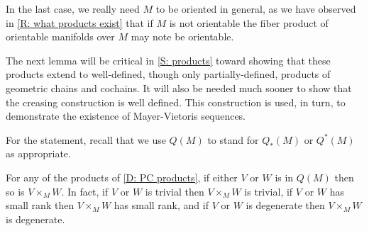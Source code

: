 In the last case, we really need $M$ to be oriented in general, as we have observed in \cref{R: what products exist} that if $M$ is not orientable the fiber product of orientable manifolds over $M$ may note be orientable.

\begin{comment}
In the cases where $r_V$ and $r_W$ are transverse embeddings, these products are represented by just taking intersections, with the orientations or co-orientations given explicitly in \cref{P: normal pullback,P: cap of immersions,P: orient intersection}.
If $r_V$ and $r_W$ are immersions, these descriptions hold locally.
\end{comment}

The next lemma will be critical in \cref{S: products} toward showing that these products extend to well-defined, though only partially-defined, products of geometric chains and cochains.
It will also be needed much sooner to show that the creasing construction is well defined.
This construction is used, in turn, to demonstrate the existence of Mayer-Vietoris sequences.

For the statement, recall that we use $Q(M)$ to stand for $Q_*(M)$ or $Q^*(M)$ as appropriate. 

\begin{lemma}\label{L: pullback with Q}
	For any of the products of \cref{D: PC products}, if either $V$ or $W$ is in $Q(M)$ then so is $V \times_M W$.
	In fact, if $V$ or $W$ is trivial then $V \times_M W$ is trivial, if $V$ or $W$ has small rank then $V \times_M W$ has small rank, and if $V$ or $W$ is degenerate then $V \times_M W$ is degenerate.
\end{lemma}

